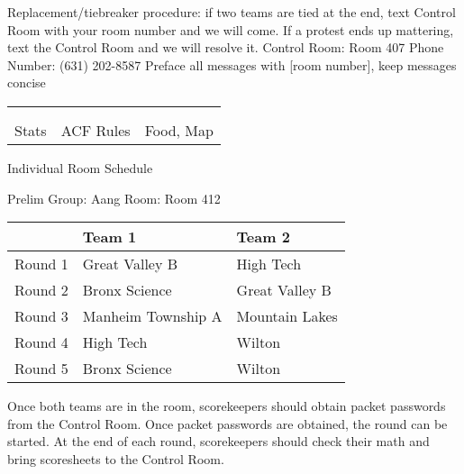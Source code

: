 \documentclass{article}%
\begin{document}
\newline%
Replacement/tiebreaker procedure: if two teams are tied at the end, text Control Room with your room number and we will come. If a protest ends up mattering, text the Control Room and we will resolve it.\newline%
\newline%
Control Room: Room 407\newline%
Phone Number: (631) 202{-}8587\newline%
Preface all messages with {[}room number{]}, keep messages concise%
\vspace*{30pt}%
\newline%
%
\begin{tabularx}{\textwidth}{YYY}%
  &  &  \\%
\\%
Stats&ACF Rules&Food, Map\\%
\end{tabularx}%
\newpage%
\begin{center}%
\begin{Huge}%
Individual Room Schedule%
\end{Huge}%
\vspace*{16pt}%
\linebreak%
\begin{Large}%
Prelim Group: Aang \hfill Room: Room 412%
\end{Large}%
\end{center}%
%
\begin{tabularx}{\textwidth}{|c|Y|Y|}%
\hline%
&Team 1&Team 2\\%
\hline%
Round 1&Great Valley B&High Tech\\%
Round 2&Bronx Science&Great Valley B\\%
Round 3&Manheim Township A&Mountain Lakes\\%
Round 4&High Tech&Wilton\\%
Round 5&Bronx Science&Wilton\\%
\hline%
\end{tabularx}%
\vspace*{16pt}%
\linebreak%
Once both teams are in the room, scorekeepers should obtain packet passwords from the Control Room. Once packet passwords are obtained, the round can be started. At the end of each round, scorekeepers should check their math and bring scoresheets to the Control Room.\newline%
\end{document}

